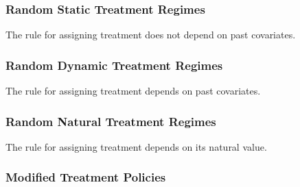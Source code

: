 \documentclass[12pt,twoside]{article}
\begin{document}
\subsubsection{Random Static Treatment Regimes}
The rule for assigning treatment does not depend on past covariates.

\subsubsection{Random Dynamic Treatment Regimes}
The rule for assigning treatment depends on past covariates.

\subsubsection{Random Natural Treatment Regimes}
The rule for assigning treatment depends on its natural value.

\subsubsection{Modified Treatment Policies}
\end{document}
